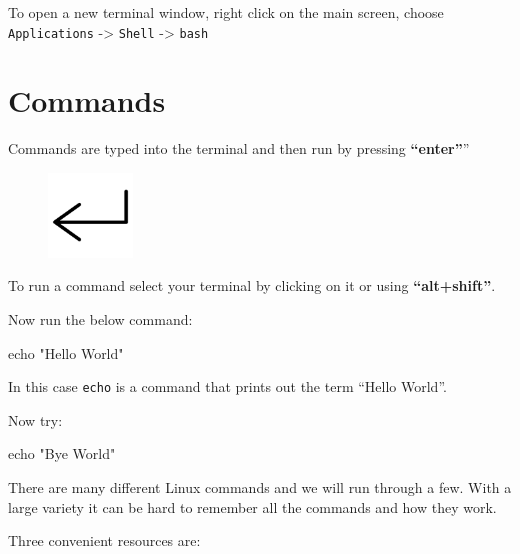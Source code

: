 \documentclass[
  letterpaper,
  DIV=11,
  numbers=noendperiod]{scrreprt}
\newenvironment{Shaded}{\begin{snugshade}}{\end{snugshade}}
\newcommand{\BuiltInTok}[1]{\textcolor[rgb]{0.00,0.23,0.31}{#1}}
\newcommand{\StringTok}[1]{\textcolor[rgb]{0.13,0.47,0.30}{#1}}
\begin{document}
To open a new terminal window, right click on the main screen, choose
\texttt{Applications} -\textgreater{} \texttt{Shell} -\textgreater{}
\texttt{bash}

\hypertarget{commands}{%
\section{Commands}\label{commands}}

Commands are typed into the terminal and then run by pressing
\textbf{``enter''}''

\begin{figure}

{\centering \includegraphics[width=0.2\textwidth,height=\textheight]{figures/enter_symbol.png}

}

\end{figure}

To run a command select your terminal by clicking on it or using
\textbf{``alt+shift''}.

Now run the below command:

\begin{Shaded}
\begin{Highlighting}[]
\BuiltInTok{echo} \StringTok{"Hello World"}
\end{Highlighting}
\end{Shaded}

In this case \texttt{echo} is a command that prints out the term ``Hello
World''.

Now try:

\begin{Shaded}
\begin{Highlighting}[]
\BuiltInTok{echo} \StringTok{"Bye World"}
\end{Highlighting}
\end{Shaded}

There are many different Linux commands and we will run through a few.
With a large variety it can be hard to remember all the commands and how
they work.

Three convenient resources are:
\end{document}
